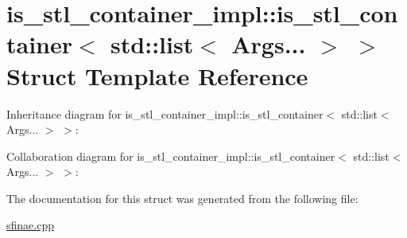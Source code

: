 \hypertarget{structis__stl__container__impl_1_1is__stl__container_3_01std_1_1list_3_01Args_8_8_8_01_4_01_4}{}\section{is\+\_\+stl\+\_\+container\+\_\+impl\+:\+:is\+\_\+stl\+\_\+container$<$ std\+:\+:list$<$ Args... $>$ $>$ Struct Template Reference}
\label{structis__stl__container__impl_1_1is__stl__container_3_01std_1_1list_3_01Args_8_8_8_01_4_01_4}


Inheritance diagram for is\+\_\+stl\+\_\+container\+\_\+impl\+:\+:is\+\_\+stl\+\_\+container$<$ std\+:\+:list$<$ Args... $>$ $>$\+:


Collaboration diagram for is\+\_\+stl\+\_\+container\+\_\+impl\+:\+:is\+\_\+stl\+\_\+container$<$ std\+:\+:list$<$ Args... $>$ $>$\+:


The documentation for this struct was generated from the following file\+:\begin{DoxyCompactItemize}
\item 
\hyperlink{sfinae_8cpp}{sfinae.\+cpp}\end{DoxyCompactItemize}
